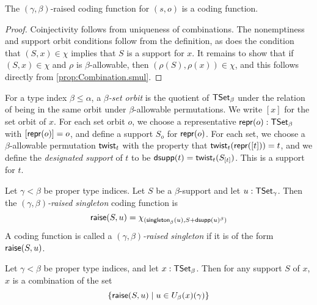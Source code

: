 \begin{proposition}
  \label{prop:raisedCodingFunction_spec}
  The \( (\gamma,\beta) \)-raised coding function for \( (s, o) \) is a coding function.
\end{proposition}
\begin{proof}
  Coinjectivity follows from uniqueness of combinations.
  The nonemptiness and support orbit conditions follow from the definition, as does the condition that \( (S, x) \in \chi \) implies that \( S \) is a support for \( x \).
  It remains to show that if \( (S, x) \in \chi \) and \( \rho \) is \( \beta \)-allowable, then \( (\rho(S), \rho(x)) \in \chi \), and this follows directly from \cref{prop:Combination.smul}.
\end{proof}
\begin{definition}
  \label{def:designatedSupport}
  For a type index \( \beta \leq \alpha \), a \emph{\( \beta \)-set orbit} is the quotient of \( \mathsf{TSet}_\beta \) under the relation of being in the same orbit under \( \beta \)-allowable permutations.
  We write \( [x] \) for the set orbit of \( x \).
  For each set orbit \( o \), we choose a representative \( \operatorname{\mathsf{repr}}(o) : \mathsf{TSet}_\beta \) with \( [\operatorname{\mathsf{repr}}(o)] = o \), and define a support \( S_o \) for \( \operatorname{\mathsf{repr}}(o) \).
  For each set, we choose a \( \beta \)-allowable permutation \( \operatorname{\mathsf{twist}}_t \) with the property that \( \operatorname{\mathsf{twist}}_t(\operatorname{\mathsf{repr}}([t])) = t \), and we define the \emph{designated support} of \( t \) to be \( \operatorname{\mathsf{dsupp}}(t) = \operatorname{\mathsf{twist}}_t(S_{[t]}) \).
  This is a support for \( t \).
\end{definition}
\begin{definition}
  \label{def:raisedSingleton}
  Let \( \gamma < \beta \) be proper type indices.
  Let \( S \) be a \( \beta \)-support and let \( u : \mathsf{TSet}_\gamma \).
  Then the \emph{\( (\gamma,\beta ) \)-raised singleton} coding function is
  \[ \operatorname{\mathsf{raise}}(S, u) = \chi_{(\operatorname{\mathsf{singleton}}_\beta(u), S + \operatorname{\mathsf{dsupp}}(u)^\beta)} \]
  A coding function is called a \emph{\( (\gamma,\beta) \)-raised singleton} if it is of the form \( \operatorname{\mathsf{raise}}(S, u) \).
\end{definition}
\begin{proposition}
  \label{prop:raise_combination}
  Let \( \gamma < \beta \) be proper type indices, and let \( x : \mathsf{TSet}_\beta \).
  Then for any support \( S \) of \( x \), \( x \) is a combination of the set
  \[ \{ \operatorname{\mathsf{raise}}(S, u) \mid u \in U_\beta(x)(\gamma) \} \]
\end{proposition}

